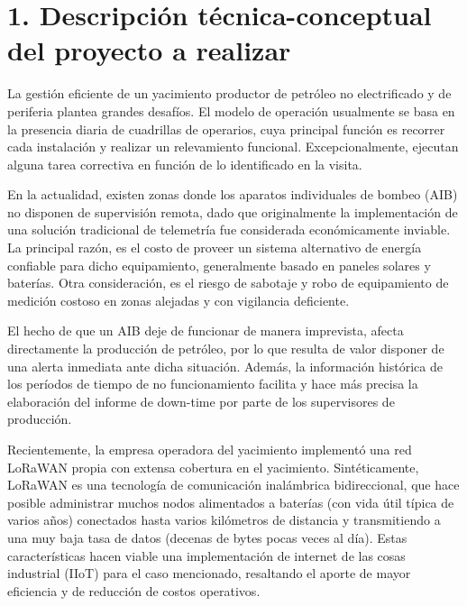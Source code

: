 \documentclass[
11pt, %
]{charter}
\begin{document}
\section{1. Descripción técnica-conceptual del proyecto a realizar}
\label{sec:descripcion}



La gestión eficiente de un yacimiento productor de petróleo no electrificado y de periferia plantea grandes desafíos. El modelo de operación usualmente se basa en la presencia diaria de cuadrillas de operarios, cuya principal función es recorrer cada instalación y realizar un relevamiento funcional. Excepcionalmente, ejecutan alguna tarea correctiva en función de lo identificado en la visita.

En la actualidad, existen zonas donde los aparatos individuales de bombeo (AIB) no disponen de supervisión remota, dado que originalmente la implementación de una solución tradicional de telemetría fue considerada económicamente inviable. La principal razón, es el costo de proveer un sistema alternativo de energía confiable para dicho equipamiento, generalmente basado en paneles solares y baterías. Otra consideración, es el riesgo de sabotaje y robo de equipamiento de medición costoso en zonas alejadas y con vigilancia deficiente. 

El hecho de que un AIB deje de funcionar de manera imprevista, afecta directamente la producción de petróleo, por lo que resulta de valor disponer de una alerta inmediata ante dicha situación. Además, la información histórica de los períodos de tiempo de no funcionamiento facilita y hace más precisa la elaboración del informe de down-time por parte de los supervisores de producción.
 
Recientemente, la empresa operadora del yacimiento implementó una red LoRaWAN propia con extensa cobertura en el yacimiento. Sintéticamente, LoRaWAN es una tecnología de comunicación inalámbrica bidireccional, que hace posible administrar muchos nodos alimentados a baterías (con vida útil típica de varios años) conectados hasta varios kilómetros de distancia y transmitiendo a una muy baja tasa de datos (decenas de bytes pocas veces al día). Estas características hacen viable una implementación de internet de las cosas industrial (IIoT) para el caso mencionado, resaltando el aporte de mayor eficiencia y de reducción de costos operativos.
\end{document}
